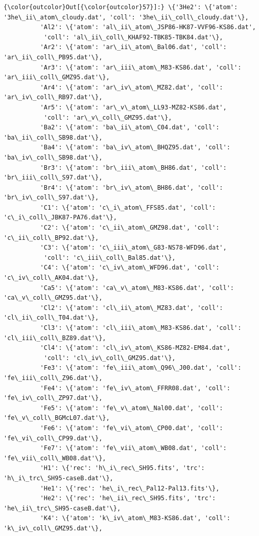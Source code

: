 \documentclass{report}
\begin{document}
            \begin{Verbatim}[commandchars=\\\{\}]
{\color{outcolor}Out[{\color{outcolor}57}]:} \{'3He2': \{'atom': '3he\_ii\_atom\_cloudy.dat', 'coll': '3he\_ii\_coll\_cloudy.dat'\},
          'Al2': \{'atom': 'al\_ii\_atom\_JSP86-HK87-VVF96-KS86.dat',
           'coll': 'al\_ii\_coll\_KHAF92-TBK85-TBK84.dat'\},
          'Ar2': \{'atom': 'ar\_ii\_atom\_Bal06.dat', 'coll': 'ar\_ii\_coll\_PB95.dat'\},
          'Ar3': \{'atom': 'ar\_iii\_atom\_M83-KS86.dat', 'coll': 'ar\_iii\_coll\_GMZ95.dat'\},
          'Ar4': \{'atom': 'ar\_iv\_atom\_MZ82.dat', 'coll': 'ar\_iv\_coll\_RB97.dat'\},
          'Ar5': \{'atom': 'ar\_v\_atom\_LL93-MZ82-KS86.dat',
           'coll': 'ar\_v\_coll\_GMZ95.dat'\},
          'Ba2': \{'atom': 'ba\_ii\_atom\_C04.dat', 'coll': 'ba\_ii\_coll\_SB98.dat'\},
          'Ba4': \{'atom': 'ba\_iv\_atom\_BHQZ95.dat', 'coll': 'ba\_iv\_coll\_SB98.dat'\},
          'Br3': \{'atom': 'br\_iii\_atom\_BH86.dat', 'coll': 'br\_iii\_coll\_S97.dat'\},
          'Br4': \{'atom': 'br\_iv\_atom\_BH86.dat', 'coll': 'br\_iv\_coll\_S97.dat'\},
          'C1': \{'atom': 'c\_i\_atom\_FFS85.dat', 'coll': 'c\_i\_coll\_JBK87-PA76.dat'\},
          'C2': \{'atom': 'c\_ii\_atom\_GMZ98.dat', 'coll': 'c\_ii\_coll\_BP92.dat'\},
          'C3': \{'atom': 'c\_iii\_atom\_G83-NS78-WFD96.dat',
           'coll': 'c\_iii\_coll\_Bal85.dat'\},
          'C4': \{'atom': 'c\_iv\_atom\_WFD96.dat', 'coll': 'c\_iv\_coll\_AK04.dat'\},
          'Ca5': \{'atom': 'ca\_v\_atom\_M83-KS86.dat', 'coll': 'ca\_v\_coll\_GMZ95.dat'\},
          'Cl2': \{'atom': 'cl\_ii\_atom\_MZ83.dat', 'coll': 'cl\_ii\_coll\_T04.dat'\},
          'Cl3': \{'atom': 'cl\_iii\_atom\_M83-KS86.dat', 'coll': 'cl\_iii\_coll\_BZ89.dat'\},
          'Cl4': \{'atom': 'cl\_iv\_atom\_KS86-MZ82-EM84.dat',
           'coll': 'cl\_iv\_coll\_GMZ95.dat'\},
          'Fe3': \{'atom': 'fe\_iii\_atom\_Q96\_J00.dat', 'coll': 'fe\_iii\_coll\_Z96.dat'\},
          'Fe4': \{'atom': 'fe\_iv\_atom\_FFRR08.dat', 'coll': 'fe\_iv\_coll\_ZP97.dat'\},
          'Fe5': \{'atom': 'fe\_v\_atom\_Nal00.dat', 'coll': 'fe\_v\_coll\_BGMcL07.dat'\},
          'Fe6': \{'atom': 'fe\_vi\_atom\_CP00.dat', 'coll': 'fe\_vi\_coll\_CP99.dat'\},
          'Fe7': \{'atom': 'fe\_vii\_atom\_WB08.dat', 'coll': 'fe\_vii\_coll\_WB08.dat'\},
          'H1': \{'rec': 'h\_i\_rec\_SH95.fits', 'trc': 'h\_i\_trc\_SH95-caseB.dat'\},
          'He1': \{'rec': 'he\_i\_rec\_Pal12-Pal13.fits'\},
          'He2': \{'rec': 'he\_ii\_rec\_SH95.fits', 'trc': 'he\_ii\_trc\_SH95-caseB.dat'\},
          'K4': \{'atom': 'k\_iv\_atom\_M83-KS86.dat', 'coll': 'k\_iv\_coll\_GMZ95.dat'\},

\end{Verbatim}
\end{document}
